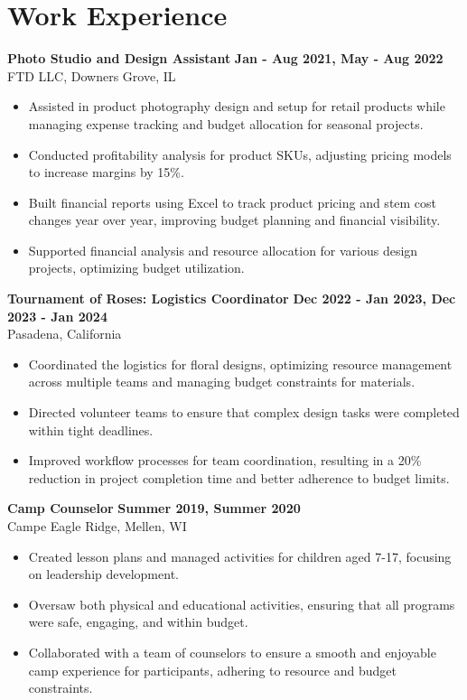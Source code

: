 \documentclass[10pt]{article}
\begin{document}
\section*{Work Experience}
\vspace{0pt}
\textbf{Photo Studio and Design Assistant} \hfill \textbf{Jan - Aug 2021, May - Aug 2022} \\
FTD LLC, Downers Grove, IL \\
\begin{itemize}[noitemsep,nosep]
    \item Assisted in product photography design and setup for retail products while managing expense tracking and budget allocation for seasonal projects.
    \item Conducted profitability analysis for product SKUs, adjusting pricing models to increase margins by 15\%.
    \item Built financial reports using Excel to track product pricing and stem cost changes year over year, improving budget planning and financial visibility.
    \item Supported financial analysis and resource allocation for various design projects, optimizing budget utilization.
\end{itemize}

\vspace{10pt}
\noindent\textbf{Tournament of Roses: Logistics Coordinator} \hfill \textbf{Dec 2022 - Jan 2023, Dec 2023 - Jan 2024} \\
Pasadena, California \\
\begin{itemize}[noitemsep,nosep]
    \item Coordinated the logistics for floral designs, optimizing resource management across multiple teams and managing budget constraints for materials.
    \item Directed volunteer teams to ensure that complex design tasks were completed within tight deadlines.
    \item Improved workflow processes for team coordination, resulting in a 20\% reduction in project completion time and better adherence to budget limits.
\end{itemize}


\vspace{10pt}
\textbf{Camp Counselor} \hfill \textbf{Summer 2019, Summer 2020} \\
Campe Eagle Ridge, Mellen, WI\\
\begin{itemize}[noitemsep,nosep]
    \item Created lesson plans and managed activities for children aged 7-17, focusing on leadership development.
    \item Oversaw both physical and educational activities, ensuring that all programs were safe, engaging, and within budget.
    \item Collaborated with a team of counselors to ensure a smooth and enjoyable camp experience for participants, adhering to resource and budget constraints.
\end{itemize}
\end{document}
